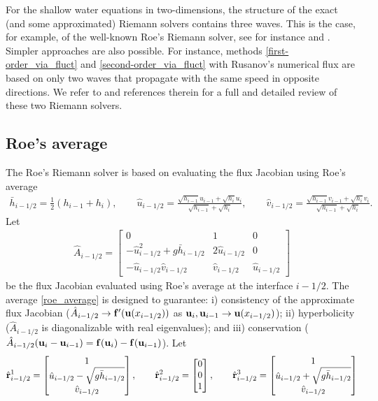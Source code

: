 \documentclass[preprint, 11pt]{article}
\newcommand{\bff}{{\bf f}}
\newcommand{\bfr}{{\bf r}}
\newcommand{\bfu}{{\bf u}}
\begin{document}
For the shallow water equations in two-dimensions, the structure of the exact (and some
approximated) Riemann solvers contains three waves. This is the case, for example, of the well-known
Roe's Riemann solver, see for instance \cite{roe1981approximate} and
\cite[\S 15.3.3 and \S 21.7]{leveque2002finite}.
Simpler approaches are also possible.
For instance, methods \eqref{first-order_via_fluct} and \eqref{second-order_via_fluct}
with Rusanov's numerical flux are based on only two waves that
propagate with the same speed in opposite directions.
We refer to \cite{ketcheson2020riemann} and references therein for
a full and detailed review of these two Riemann solvers.

\subsection{Roe's average}\label{sec:roe}
The Roe's Riemann solver is based on evaluating the flux Jacobian using Roe's average
\begin{align}\label{roe_average}
  \bar h_{i-1/2}=\frac{1}{2}(h_{i-1}+h_i), \qquad
  \hat u_{i-1/2}=\frac{\sqrt{h_{i-1}}u_{i-1}+\sqrt{h_i}u_i}{\sqrt{h_{i-1}}+\sqrt{h_i}}, \qquad
  \hat v_{i-1/2}=\frac{\sqrt{h_{i-1}}v_{i-1}+\sqrt{h_i}v_i}{\sqrt{h_{i-1}}+\sqrt{h_i}}.
\end{align}
Let
\begin{align*}
\hat A_{i-1/2} =
\begin{bmatrix}
  0 & 1 & 0 \\
  -\hat u_{i-1/2}^2+g\bar h_{i-1/2} & 2\hat u_{i-1/2} & 0 \\
  -\hat u_{i-1/2} \hat v_{i-1/2} & \hat v_{i-1/2} & \hat u_{i-1/2}
\end{bmatrix}
\end{align*}
be the flux Jacobian evaluated using Roe's average at the interface $i-1/2$.
The average \eqref{roe_average} is designed to guarantee:
i)  consistency of the approximate flux Jacobian
($\hat A_{i-1/2}\rightarrow \bff^\prime(\bfu(x_{i-1/2}))$ as $\bfu_i, \bfu_{i-1}\rightarrow \bfu(x_{i-1/2})$);
ii) hyperbolicity ($\hat A_{i-1/2}$ is diagonalizable with real eigenvalues);
and iii) conservation ($\hat A_{i-1/2}(\bfu_i-\bfu_{i-1})=\bff(\bfu_i)-\bff(\bfu_{i-1})$).
Let
\begin{align*}
  \hat \bfr^1_{i-1/2} =
  \begin{bmatrix}
    1 \\
    \hat u_{i-1/2}-\sqrt{g\bar h_{i-1/2}}\\
    \hat v_{i-1/2}
  \end{bmatrix},
  \qquad
  \hat \bfr^2_{i-1/2} =
  \begin{bmatrix}
    0\\
    0\\
    1
  \end{bmatrix},
  \qquad
  \hat \bfr^3_{i-1/2} =
  \begin{bmatrix}
    1 \\
    \hat u_{i-1/2}+\sqrt{g\bar h_{i-1/2}}\\
    \hat v_{i-1/2}
  \end{bmatrix}
\end{align*}
\end{document}
